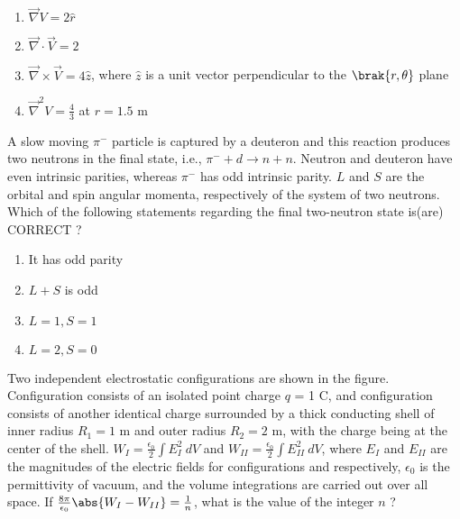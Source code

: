 \begin{enumerate}
    \item $\overrightarrow{\nabla}V = 2\hat{r}$
    \item $\overrightarrow{\nabla}\cdot\overrightarrow{V} = 2$
    \item $\overrightarrow{\nabla}\times\overrightarrow{V} = 4\hat{z}$, where $\hat{z}$ is a unit vector perpendicular to the $\brak{r, \theta}$ plane
    \item $\overrightarrow{\nabla}^2V = \frac{4}{3}$ at $r = 1.5$ m \\
\end{enumerate}
\item A slow moving $\pi^{-}$ particle is captured by a deuteron  and this reaction produces two neutrons  in the final state, i.e., $\pi^{-} + d \rightarrow n + n$. Neutron and deuteron have even intrinsic parities, whereas $\pi^{-}$ has odd intrinsic parity. $L$ and $S$ are the orbital and spin angular momenta, respectively of the system of two neutrons. Which of the following statements regarding the final two-neutron state is(are) CORRECT ? 
\begin{enumerate}
    \item It has odd parity
    \item $L + S$ is odd
    \item $L = 1, S = 1$
    \item $L = 2, S = 0$ \\ 
\end{enumerate}
\item Two independent electrostatic configurations are shown in the figure.
Configuration  consists of an isolated point charge $q$ = 1 C, and configuration  consists of another identical charge surrounded by a thick conducting shell of inner radius $R_1 = 1$ m and outer radius $R_2 = 2$ m, with the charge being at the center of the shell. $W_{I} = \frac{\epsilon_0}{2}\int E_{I}^2\ dV$ and $W_{II} = \frac{\epsilon_0}{2}\int E_{II}^2\ dV$, where $E_{I}$ and $E_{II}$ are the magnitudes of the electric fields for configurations  and  respectively, $\epsilon_0$ is the permittivity of vacuum, and the volume integrations are carried out over all space. If $\frac{8\pi}{\epsilon_0}\abs{W_{I} - W_{II}} = \frac{1}{n}$, what is
the value of the integer $n$ ?
\begin{figure}[!ht]
\centering
\resizebox{0.5\textwidth}{!}{%

}%
\end{figure} \\
